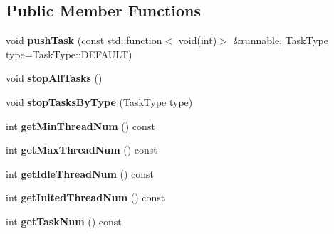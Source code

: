 \subsection*{Public Member Functions}
\begin{DoxyCompactItemize}
\item 
\mbox{\label{classcocos2d_1_1experimental_1_1ThreadPool_a44a4d0f1f4140d7c0faf7f8b77d134fc}} 
void {\bfseries push\+Task} (const std\+::function$<$ void(int)$>$ \&runnable, Task\+Type type=Task\+Type\+::\+D\+E\+F\+A\+U\+LT)
\item 
\mbox{\label{classcocos2d_1_1experimental_1_1ThreadPool_a4964e4140ab8b1a03470f301c617aea2}} 
void {\bfseries stop\+All\+Tasks} ()
\item 
\mbox{\label{classcocos2d_1_1experimental_1_1ThreadPool_a9d2d03736025fc57b37d63ee2ffcf431}} 
void {\bfseries stop\+Tasks\+By\+Type} (Task\+Type type)
\item 
\mbox{\label{classcocos2d_1_1experimental_1_1ThreadPool_ad8c342b4139194783a478bc2db31ceda}} 
int {\bfseries get\+Min\+Thread\+Num} () const
\item 
\mbox{\label{classcocos2d_1_1experimental_1_1ThreadPool_aad563f014a6276f2c48979ae2a22efe8}} 
int {\bfseries get\+Max\+Thread\+Num} () const
\item 
\mbox{\label{classcocos2d_1_1experimental_1_1ThreadPool_a40ff3c0f42d3ecb71565c0520d732a89}} 
int {\bfseries get\+Idle\+Thread\+Num} () const
\item 
\mbox{\label{classcocos2d_1_1experimental_1_1ThreadPool_a68700e241d5669acfc004f0b8061c6a8}} 
int {\bfseries get\+Inited\+Thread\+Num} () const
\item 
\mbox{\label{classcocos2d_1_1experimental_1_1ThreadPool_a3f6cb122485d908ddfa2d74dd96f6afe}} 
int {\bfseries get\+Task\+Num} () const
\item 

\end{DoxyCompactItemize}
